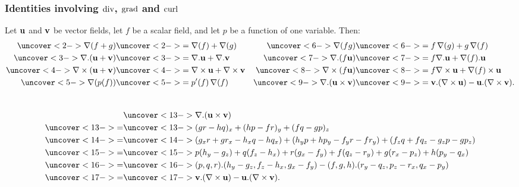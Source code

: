 \documentclass[9pt]{beamer}
\begin{document}
\begin{frame}[t]
 \frametitle{Identities involving $\operatorname{div}$, $\operatorname{grad}$ and $\operatorname{curl}$}

 Let $\mathbf{u}$ and $\mathbf{v}$ be vector
 fields, let $f$ be a scalar field, and let $p$ be a function of one
 variable.  Then:
 \begin{align*}
  \uc<2->{\nabla(f+g)}        &\uc<2->{= \nabla(f) + \nabla(g)} &
  \uc<6->{\nabla(fg)}         &\uc<6->{= f\,\nabla(g) + g\,\nabla(f)} \\
  \uc<3->{\nabla.(\vu+\vv)}   &\uc<3->{= \nabla.\vu + \nabla.\vv }&
  \uc<7->{\nabla.(f\vu)}      &\uc<7->{= f\nabla.\vu + \nabla(f).\vu }\\
  \uc<4->{\nabla\tm(\vu+\vv)} &\uc<4->{= \nabla\tm\vu + \nabla\tm\vv }&
  \uc<8->{\nabla\tm(f\vu)}    &\uc<8->{= f\nabla\tm\vu + \nabla(f)\tm\vu }\\
  \uc<5->{\nabla(p(f))}       &\uc<5->{= p'(f)\,\nabla(f)} &
  \uc<9->{\nabla.(\vu\tm\vv)} &\uc<9->{= \vv.(\nabla\tm\vu) - \vu.(\nabla\tm\vv).}
 \end{align*}
 \\
 \begin{align*}
   & \uc<13->{\nabla.(\vu\tm\vv)} \\
   \uc<13->{=}&\uc<13->{ (gr-hq)_x + (hp-fr)_y + (fq-gp)_z} \\
   \uc<14->{=}&\uc<14->{
      (g_xr+gr_x-h_xq-hq_x) +
      (h_yp+hp_y-f_yr-fr_y) +
      (f_zq+fq_z-g_zp-gp_z)} \\
   \uc<15->{=}&\uc<15->{
      p(h_y-g_z) + q(f_z-h_x) + r(g_x-f_y) +
      f(q_z-r_y) + g(r_x-p_z) + h(p_y-q_x)} \\
   \uc<16->{=}&\uc<16->{
      (p,q,r).(h_y-g_z,f_z-h_x,g_x-f_y) -  
      (f,g,h).(r_y-q_z,p_z-r_x,q_x-p_y)} \\
   \uc<17->{=}&\uc<17->{ \vv.(\nabla\tm\vu) - \vu.(\nabla\tm\vv).}
 \end{align*}
\end{frame}
\end{document}
